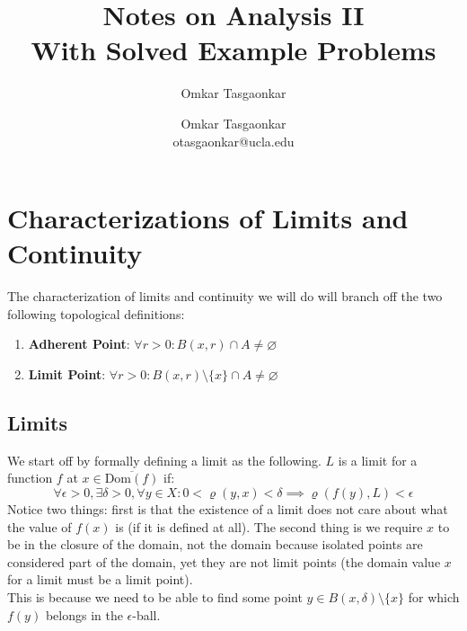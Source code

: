 \documentclass[10pt,letterpaper]{article} %
\author{Omkar Tasgaonkar}
\title{Notes on Analysis II\\[0.5em] \large With Solved Example Problems}
\author{Omkar Tasgaonkar \\ \small otasgaonkar@ucla.edu}
\date{}
\begin{document}
\maketitle
\thispagestyle{firstpage}
\tableofcontents

\pagebreak

\section{Characterizations of Limits and Continuity}
The characterization of limits and continuity we will do will branch off the two following topological definitions:
\begin{enumerate}
\item \textbf{Adherent Point}: $\forall r > 0: B(x, r) \cap A \neq \varnothing$
\item \textbf{Limit Point}: $\forall r > 0: B(x, r)\setminus \{x\} \cap A \neq \varnothing$
\end{enumerate}

\subsection{Limits}
We start off by formally defining a limit as the following. $L$ is a limit for a function $f$ at $x \in \overline{\text{Dom}(f)}$ if:
\begin{equation*}
  \forall \epsilon > 0, \exists \delta > 0, \forall y \in X: 0 < \varrho(y, x) < \delta \implies \varrho(f(y), L) < \epsilon
\end{equation*}
Notice two things: first is that the existence of a limit does not care about what the value of $f(x)$ is (if it is defined at all). The second thing is we require $x$ to be in the closure of the domain, not the domain because isolated points are considered part of the domain, yet they are not limit points (the domain value $x$ for a limit must be a limit point).\\

This is because we need to be able to find some point $y \in B(x, \delta) \setminus \{x\}$ for which $f(y)$ belongs in the $\epsilon$-ball.\\
\end{document}
